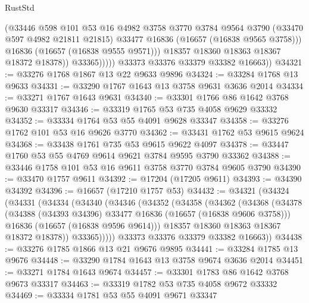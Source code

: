 \begin{lexlean}{RustStd}
\begin{coremodule}
                        (@33446
                          @598
                          @101
                          @53
                          @16
                          @4982
                          @3758
                          @3770
                          @3784
                          @9564
                          @3790
                          (@33470 @597 @4982 @21811 @21815)
                          @33477
                          @16836
                          (@16657 (@16838 @9565 @3758)))
                        @16836
                        (@16657 (@16838 @9555 @9571)))
                      @18357
                      @18360
                      @18363
                      @18367
                      @18372
                      @18378))
                  @33365)))))
        @33373
        @33376
        @33379
        @33382
        @16663))
@34321 := @33276 @1768 @1867 @13 @22 @9633 @9896
@34324 := @33284 @1768 @13 @9633
@34331 := @33290 @1767 @1643 @13 @3758 @9631 @3636 @2014
@34334 := @33271 @1767 @1643 @9631
@34340 := @33301 @1766 @86 @1642 @3768 @9630 @33317
@34346 := @33319 @1765 @53 @735 @4058 @9629 @33332
@34352 := @33334 @1764 @53 @55 @4091 @9628 @33347
@34358 := @33276 @1762 @101 @53 @16 @9626 @3770
@34362 := @33431 @1762 @53 @9615 @9624
@34368 := @33438 @1761 @735 @53 @9615 @9622 @4097
@34378 := @33447 @1760 @53 @55 @4769 @9614 @9621 @3784 @9595 @3790 @33362
@34388 := @33446 @1758 @101 @53 @16 @9611 @3758 @3770 @3784 @9605 @3790
@34390 := @33470 @1757 @9611
@34392 := @17204 (@17205 @9611)
@34393 := @34390 @34392
@34396 := @16657 (@17210 @1757 @53)
@34432 := @34321
    (@34324
      (@34331
        (@34334
          (@34340
            (@34346
              (@34352
                (@34358
                  (@34362
                    (@34368
                      (@34378
                        (@34388 (@34393 @34396) @33477 @16836 (@16657 (@16838 @9606 @3758)))
                        @16836
                        (@16657 (@16838 @9596 @9614)))
                      @18357
                      @18360
                      @18363
                      @18367
                      @18372
                      @18378))
                  @33365)))))
        @33373
        @33376
        @33379
        @33382
        @16663))
@34438 := @33276 @1785 @1866 @13 @21 @9676 @9895
@34441 := @33284 @1785 @13 @9676
@34448 := @33290 @1784 @1643 @13 @3758 @9674 @3636 @2014
@34451 := @33271 @1784 @1643 @9674
@34457 := @33301 @1783 @86 @1642 @3768 @9673 @33317
@34463 := @33319 @1782 @53 @735 @4058 @9672 @33332
@34469 := @33334 @1781 @53 @55 @4091 @9671 @33347

\end{coremodule}
\end{lexlean}
